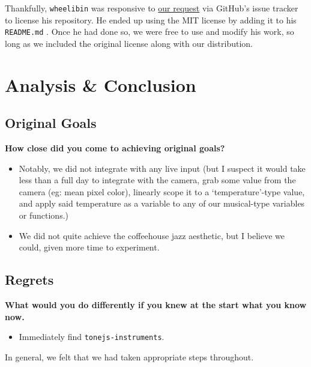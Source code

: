 \documentclass[12pt,a4paper]{article}
\newcommand{\code}{\texttt}
\newcommand{\lightcode}[1]{\colorbox{light-gray}{\texttt{#1}}}
\begin{document}
Thankfully, \code{wheelibin} was responsive to \href{https://github.com/wheelibin/synaesthesia/issues/2}{our request} via GitHub's issue tracker to license his repository. He ended up using the MIT license by adding it to his \lightcode{README.md} \cite{synaesthesia-license}. Once he had done so, we were free to use and modify his work, so long as we included the original license along with our distribution. 


\pagebreak
\section{Analysis \& Conclusion}
\subsection{Original Goals}
\textbf{How close did you come to achieving original goals?}
\begin{itemize}
	\item Notably, we did not integrate with any live input (but I suspect it would take less than a full day to integrate with the camera, grab some value from the camera (eg: mean pixel color), linearly scope it to a `temperature'-type value, and apply said temperature as a variable to any of our musical-type variables or functions.)
	\item We did not quite achieve the coffeehouse jazz aesthetic, but I believe we could, given more time to experiment.
\end{itemize}

\subsection{Regrets}
\textbf{What would you do differently if you knew at the start what you know now.}
\begin{itemize}
	\item Immediately find \lightcode{tonejs-instruments}.
\end{itemize}

In general, we felt that we had taken appropriate steps throughout.
\end{document}
